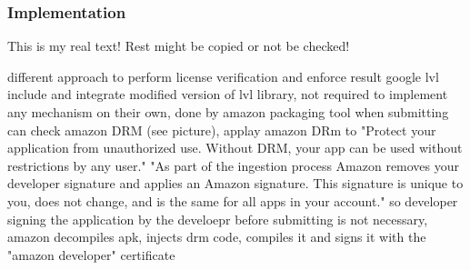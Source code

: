 \subsubsection{Implementation}\label{subsection:license-amazon-implementation}
This is my real text! Rest might be copied or not be checked!

%
different approach to perform license verification and enforce result
google lvl include and integrate modified version of lvl library, not required to implement any mechanism on their own, done by amazon packaging tool
when submitting can check amazon DRM (see picture), applay amazon DRm to "Protect your application from unauthorized use. Without DRM, your app can be used without restrictions by any user."
"As part of the ingestion process Amazon removes your developer signature and applies an Amazon signature. This signature is unique to you, does not change, and is the same for all apps in your account." so developer signing the application by the develoepr before submitting is not necessary, amazon decompiles apk, injects drm code, compiles it and signs it with the "amazon developer" certificate
\cite{munteanLicensing}
%
